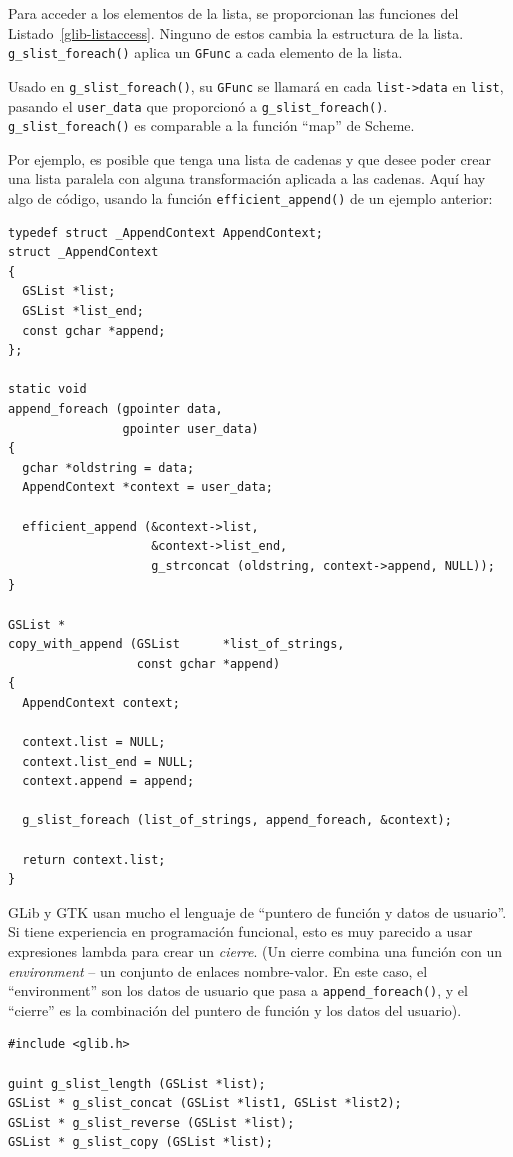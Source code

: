 Para acceder a los elementos de la lista, se proporcionan las funciones del Listado~\ref{glib-listaccess}. Ninguno de estos cambia la estructura de la lista. \lstinline{g_slist_foreach()} aplica un \lstinline{GFunc} a cada elemento de la lista.

Usado en \lstinline{g_slist_foreach()}, su \lstinline{GFunc} se llamará en cada \lstinline{list->data} en \lstinline{list}, pasando el \lstinline{user_data} que proporcionó a \lstinline{g_slist_foreach()}. \lstinline{g_slist_foreach()} es comparable a la función ``map'' de Scheme.

Por ejemplo, es posible que tenga una lista de cadenas y que desee poder crear una lista paralela con alguna transformación aplicada a las cadenas. Aquí hay algo de código, usando la función \lstinline{efficient_append()} de un ejemplo anterior:

\begin{lstlisting}[style=GLib/GTK]
typedef struct _AppendContext AppendContext;
struct _AppendContext
{
  GSList *list;
  GSList *list_end;
  const gchar *append;
};

static void
append_foreach (gpointer data,
                gpointer user_data)
{
  gchar *oldstring = data;
  AppendContext *context = user_data;

  efficient_append (&context->list,
                    &context->list_end,
                    g_strconcat (oldstring, context->append, NULL));
}

GSList *
copy_with_append (GSList      *list_of_strings,
                  const gchar *append)
{
  AppendContext context;

  context.list = NULL;
  context.list_end = NULL;
  context.append = append;

  g_slist_foreach (list_of_strings, append_foreach, &context);

  return context.list;
}
\end{lstlisting}

GLib y GTK usan mucho el lenguaje de ``puntero de función y datos de usuario''. Si tiene experiencia en programación funcional, esto es muy parecido a usar expresiones lambda para crear un \emph{cierre}. (Un cierre combina una función con un \emph{environment} -- un conjunto de enlaces nombre-valor. En este caso, el ``environment'' son los datos de usuario que pasa a \lstinline{append_foreach()}, y el ``cierre'' es la combinación del puntero de función y los datos del usuario).

\begin{lstlisting}[style=GLib/GTK, caption={Manipular una lista vinculada}, label=glib-listmanip]
#include <glib.h>

guint g_slist_length (GSList *list);
GSList * g_slist_concat (GSList *list1, GSList *list2);
GSList * g_slist_reverse (GSList *list);
GSList * g_slist_copy (GSList *list);
\end{lstlisting}

